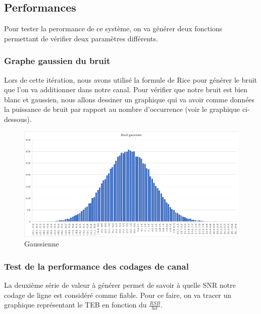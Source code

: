 \subsection{Performances}

Pour tester la perormance de ce système, on va générer deux fonctions permettant de vérifier deux paramètres différents.

\subsubsection{Graphe gaussien du bruit}

Lors de cette itération, nous avons utilisé la formule de Rice pour générer le bruit que l'on va additionner dans notre canal. Pour vérifier que notre bruit est bien blanc et gaussien, nous allons  dessiner un graphique qui va avoir comme données la puissance de bruit par rapport au nombre d'occurrence (voir le graphique ci-dessous).

\begin{figure}[H]
\centering
\includegraphics[width=1\textwidth]{img/gaussienne.png}
\caption{\label{fig:gaussienne}Gaussienne}
\end{figure}

\subsubsection{Test de la performance des codages de canal}

La deuxième série de valeur à générer permet de savoir à quelle SNR notre codage de ligne est considéré comme fiable.
Pour ce faire, on va tracer un graphique représentant le TEB en fonction du $\frac{RSB}{bit}$.

